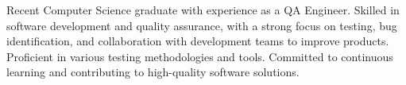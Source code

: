 

\begin{cvparagraph}

Recent Computer Science graduate with experience as a QA Engineer. Skilled in software development and quality assurance, with a strong focus on testing, bug identification, and collaboration with development teams to improve products. Proficient in various testing methodologies and tools. Committed to continuous learning and contributing to high-quality software solutions.
\end{cvparagraph}